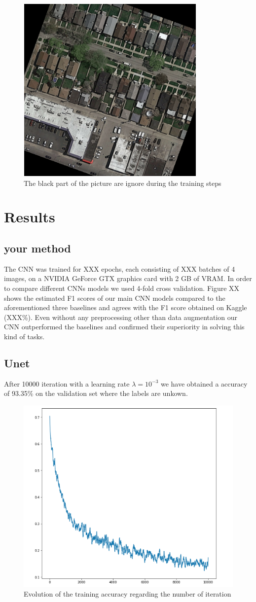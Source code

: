 \documentclass[10pt,conference,compsocconf]{IEEEtran}
\begin{document}
\begin{figure}[h]
 \centering
 \includegraphics[width=0.35\columnwidth]{img/rot.png}
 \caption{The black part of the picture are ignore during the training steps}
 \vspace{-3mm}
 \label{fig:denoise-fourier}
\end{figure}


\clearpage

\section{Results}
\label{sec:results}
\subsection{your method}
	The CNN was trained for XXX epochs, each consisting of XXX batches of 4 images, on a NVIDIA GeForce GTX graphics card with 2 GB of VRAM. In order to compare different CNNs models we used 4-fold cross validation. Figure XX shows the estimated F1 scores of our main CNN models compared to the aforementioned three baselines and agrees with the F1 score obtained on Kaggle (XXX\%). Even without any preprocessing other than data augmentation our CNN outperformed the baselines and confirmed their superiority in solving this kind of tasks.
\subsection{Unet}
	After 10000 iteration with a learning rate $\lambda = 10^{-3}$ we have obtained a accuracy of 93.35\% on the validation set where the labels are unkown.
	\begin{figure}[h]
		\centering
		\includegraphics[width=0.8\columnwidth]{img/loss_unet.png}
		\caption{Evolution of the training accuracy regarding the number of iteration}
		\label{fig:lossunet}
	\end{figure}
\end{document}
